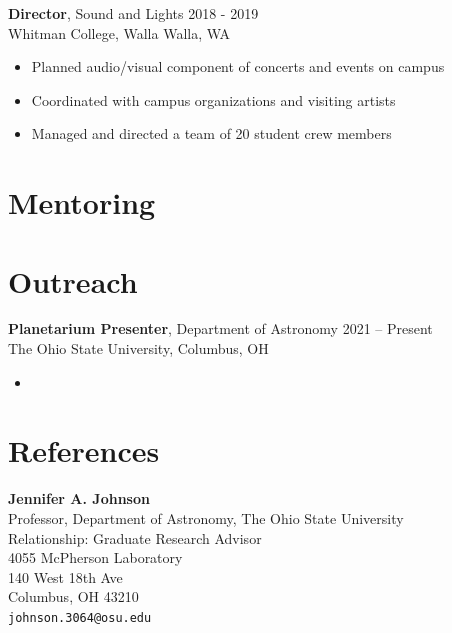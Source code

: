 \documentclass[12pt]{article}
\begin{document}
\textbf{Director}, Sound and Lights \hfill 2018 - 2019 \\
Whitman College, Walla Walla, WA
\begin{itemize}
    \item Planned audio/visual component of concerts and events on campus
    \item Coordinated with campus organizations and visiting artists
    \item Managed and directed a team of 20 student crew members
\end{itemize}

\section*{Mentoring}

\section*{Outreach}

{\bf Planetarium Presenter}, Department of Astronomy \hfill 2021 -- Present \\
The Ohio State University, Columbus, OH
\begin{itemize}
    \item 
\end{itemize}



\section*{References}

\textbf{Jennifer A. Johnson} \\
Professor, Department of Astronomy, The Ohio State University \\
Relationship: Graduate Research Advisor \\
4055 McPherson Laboratory \\
140 West 18th Ave \\
Columbus, OH 43210 \\
\texttt{johnson.3064@osu.edu}
\vspace{12pt}
\end{document}
